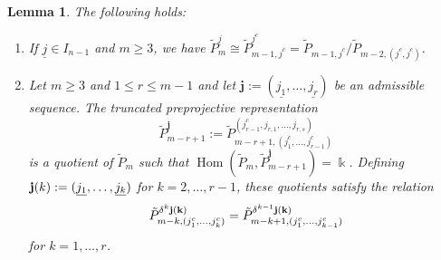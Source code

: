 \documentclass{amsart}
\newtheorem{lemma}[theorem]{Lemma}
\newcommand{\uj}{\underline j}
\newcommand{\kk}{\Bbbk}
\newcommand{\Hom}{\operatorname{Hom}}
\begin{document}
\begin{lemma}The following holds:
  \label{le:preprojective lifts}
  \begin{enumerate}
    \item If $\uj\in I_{n-1}$ and $m\geq 3$, we have $\tilde P_{m}^{\uj}\cong \tilde P_{m-1,j^c}^{\uj^c}= \tilde P_{m-1,j^c}/\tilde P_{m-2,(j^c,j^c)}$.
		\item Let $m\geq 3$ and $1\leq r\leq m-1$ and let $\mathbf j:=(\underline{j_1},\ldots,\underline{j_r})$ be an admissible sequence. The truncated preprojective representation
		$$\tilde P^{\mathbf j}_{m-r+1}:=\tilde P_{m-r+1,(j_1^c,\ldots,j_{r-1}^c)}^{(j_{r-1}^c,j_{r,1},\ldots,j_{r,s})}$$
	 is a quotient of $\tilde P_m$ such that $\Hom(\tilde P_m,\tilde P^{\mathbf j}_{m-r+1})=\kk$. Defining ${\bf j}(k):=(\underline{j_1},\ldots,\underline{j_k})$ for $k=2,\ldots,r-1$, these quotients satisfy the relation
		\[\tilde P_{m-k,(j_1^c,\ldots,j_k^c)}^{\delta^k{\bf j(k)}}=\tilde P_{m-k+1,(j_1^c,\ldots,j_{k-1}^c)}^{\delta^{k-1}\bf j(k)}\]
		for $k=1,\ldots,r$.
  \end{enumerate}
\end{lemma}
\end{document}
